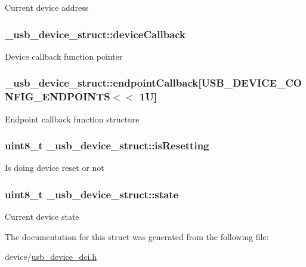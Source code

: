 Current device address \hypertarget{struct__usb__device__struct_a9b9546705d3f2bbccf1a05605cdbf869}{
\subsubsection[{device\-Callback}]{ \-\_\-usb\-\_\-device\-\_\-struct\-::device\-Callback}}\label{struct__usb__device__struct_a9b9546705d3f2bbccf1a05605cdbf869}
Device callback function pointer \hypertarget{struct__usb__device__struct_a29eda36612811852d13e534b86ac927d}{
\subsubsection[{endpoint\-Callback}]{ \-\_\-usb\-\_\-device\-\_\-struct\-::endpoint\-Callback\mbox{[}U\-S\-B\-\_\-\-D\-E\-V\-I\-C\-E\-\_\-\-C\-O\-N\-F\-I\-G\-\_\-\-E\-N\-D\-P\-O\-I\-N\-T\-S$<$$<$ 1\-U\mbox{]}}}\label{struct__usb__device__struct_a29eda36612811852d13e534b86ac927d}
Endpoint callback function structure \hypertarget{struct__usb__device__struct_a1df9a5fa5845e9b0adca6733e87a82d6}{
\subsubsection[{is\-Resetting}]{\setlength{\rightskip}{0pt plus 5cm}uint8\-\_\-t \-\_\-usb\-\_\-device\-\_\-struct\-::is\-Resetting}}\label{struct__usb__device__struct_a1df9a5fa5845e9b0adca6733e87a82d6}
Is doing device reset or not \hypertarget{struct__usb__device__struct_a9fa0b5304d25ba7cec0517ae05cad566}{
\subsubsection[{state}]{\setlength{\rightskip}{0pt plus 5cm}uint8\-\_\-t \-\_\-usb\-\_\-device\-\_\-struct\-::state}}\label{struct__usb__device__struct_a9fa0b5304d25ba7cec0517ae05cad566}
Current device state 

The documentation for this struct was generated from the following file\-:\begin{DoxyCompactItemize}
\item 
device/\hyperlink{usb__device__dci_8h}{usb\-\_\-device\-\_\-dci.\-h}\end{DoxyCompactItemize}
